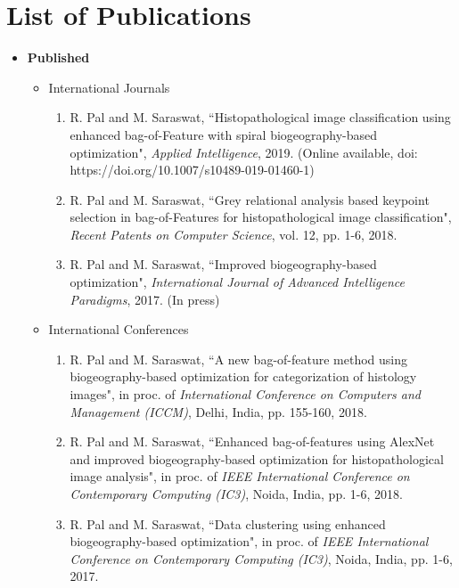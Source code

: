 


\chapter*{\fontsize{16}{16} \selectfont List of Publications}

\vspace{-0.3in}
\begin{itemize}
\item \textbf{Published}

\begin{itemize}
\item International Journals
\begin{enumerate}
\item R. Pal and M. Saraswat, ``Histopathological image classification using enhanced bag-of-Feature with spiral biogeography-based optimization", \emph{Applied Intelligence}, 2019. (Online available, doi: https://doi.org/10.1007/s10489-019-01460-1)
\item R. Pal and M. Saraswat, ``Grey relational analysis based keypoint selection in bag-of-Features for histopathological image classification", \emph{Recent Patents on Computer Science}, vol. 12, pp. 1-6, 2018. 
\item R. Pal and M. Saraswat, ``Improved biogeography-based optimization", 				\emph{International Journal of Advanced Intelligence Paradigms}, 2017. (In press) 
\end{enumerate}
\item International Conferences
\begin{enumerate}
\item R. Pal and M. Saraswat, ``A new bag-of-feature method using biogeography-based optimization for categorization of histology images", in proc. of \emph{ International Conference on Computers and Management (ICCM)}, Delhi, India, pp. 155-160, 2018. 

\item R. Pal and M. Saraswat, ``Enhanced bag-of-features using AlexNet and improved biogeography-based optimization for histopathological image analysis", in proc. of \emph{IEEE International Conference on Contemporary Computing (IC3)}, Noida, India, pp. 1-6, 2018.
\item R. Pal and M. Saraswat, ``Data clustering using enhanced biogeography-based optimization", in proc. of \emph{IEEE International Conference on Contemporary Computing (IC3)}, Noida, India, pp. 1-6, 2017.
\end{enumerate}
\end{itemize}
\end{itemize}

